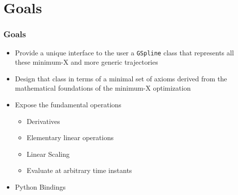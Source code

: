 \section{Goals}

\begin{frame}[t]
	\frametitle{Goals}

	{\fontsize{10}{6}
		\begin{itemize}
			\item Provide a unique interface to the user a \Verb|GSpline| class that represents all these minimum-X and more generic trajectories
			\item Design that class in terms of a minimal set of axioms derived from the mathematical foundations of the minimum-X optimization
			\item Expose the fundamental operations
			      \begin{itemize}
				      \item Derivatives
				      \item Elementary linear operations
				      \item Linear Scaling
				      \item Evaluate at arbitrary time instants
			      \end{itemize}
			\item Python Bindings
		\end{itemize}
	}
\end{frame}

